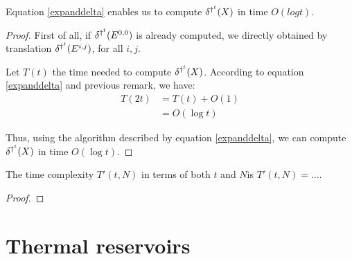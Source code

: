 \begin{question}
\begin{prop}
 Equation \ref{expanddelta} enables us to compute $\delta^{\dag^t}(X)$ in time $O(log t)$.
\end{prop}

\begin{proof}
 First of all, if $\delta^{\dag^t} (E^{0,0})$ is already computed, we directly obtained by translation $\delta^{\dag^t} (E^{i,j})$, for all $i,j$.
 
 Let $T(t)$ the time needed to compute $\delta^{\dag^t}(X)$. According to equation \ref{expanddelta} and previous remark, we have:
 \[\begin{split}
    T(2t) & = T(t) + O(1) \\
	  & = O(\log t)
   \end{split}
\]
 
 Thus, using the algorithm described by equation \ref{expanddelta}, we can compute $\delta^{\dag^t}(X)$ in time $O(\log t)$. 
\end{proof}

\begin{prop}
 The time complexity $T'(t,N)$ in terms of both $t$ and $N$is $T'(t,N) = ...$.
\end{prop}

\begin{proof}
 
\end{proof}


\end{question}


\section{Thermal reservoirs}

\begin{question}
 
 \begin{ex}
  
 \end{ex}

\end{question}



